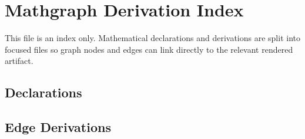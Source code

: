 \section{Mathgraph Derivation Index}

This file is an index only. Mathematical declarations and derivations are split into focused files so graph nodes and edges can link directly to the relevant rendered artifact.

\subsection{Declarations}




















\subsection{Edge Derivations}























